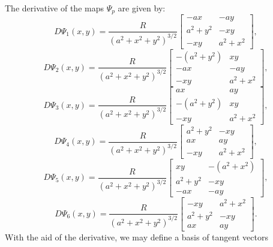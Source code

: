 The derivative of the maps $\Psi_p$ are given by:
\begin{equation*}
	D\Psi_{1}(x,y) = \frac{R}{{(a^2 + x^2 + y^2)}^{3/2}}
	\begin{bmatrix}
		-ax & -ay \\
	 	 a^2+y^2  & -xy \\
		 -xy  & a^2+x^2
	\end{bmatrix},
\end{equation*}
\begin{equation*}
	D\Psi_{2}(x,y) = \frac{R}{{(a^2 + x^2 + y^2)}^{3/2}}
	\begin{bmatrix}
		-(a^2+y^2) & xy \\
		 -ax &  -ay \\
		 -xy &  a^2+x^2
	\end{bmatrix},
\end{equation*}
\begin{equation*}
	D\Psi_{3}(x,y) = \frac{R}{{(a^2 + x^2 + y^2)}^{3/2}}
	\begin{bmatrix}
		 ax &  ay \\
		-(a^2+y^2) & xy \\
		 -xy &  a^2+x^2
	\end{bmatrix},
\end{equation*}
\begin{equation*}
	D\Psi_{4}(x,y) = \frac{R}{{(a^2 + x^2 + y^2)}^{3/2}}	
	\begin{bmatrix}
		 a^2+y^2 &  -xy \\
		 ax & ay \\
		 -xy &  a^2+x^2
	\end{bmatrix},
\end{equation*}
\begin{equation*}
	D\Psi_{5}(x,y) = \frac{R}{{(a^2 + x^2 + y^2)}^{3/2}}	
	\begin{bmatrix}
		 xy  & -(a^2+x^2) \\
	 	 a^2+y^2  &  -xy \\
		-ax & -ay
	\end{bmatrix},
\end{equation*}
\begin{equation*}
	D\Psi_{6}(x,y) = \frac{R}{{(a^2 + x^2 + y^2)}^{3/2}}
	\begin{bmatrix}
		 -xy  &  a^2+x^2 \\
		 a^2+y^2  &  -xy \\
		 ax &  ay
	\end{bmatrix}.
\end{equation*}
With the aid of the derivative, we may define a basis of tangent vectors 
